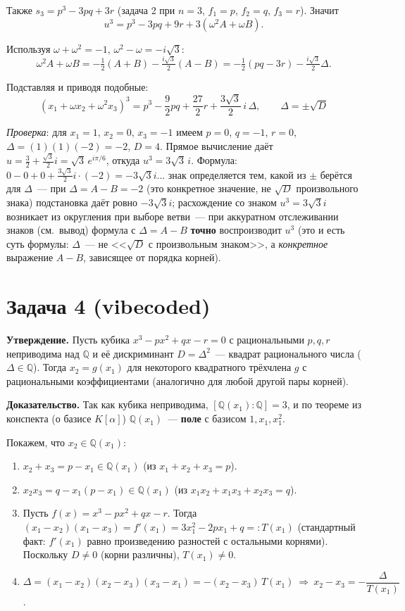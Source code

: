 \documentclass[12pt]{article}
\begin{document}
	Также $s_3=p^3-3pq+3r$ (задача 2 при $n=3$, $f_1=p$, $f_2=q$, $f_3=r$). Значит
	\[
	u^3=p^3-3pq+9r+3(\omega^2A+\omega B).
	\]
	
	Используя $\omega+\omega^2=-1$, $\omega^2-\omega=-i\sqrt{3}$:
	\[
	\omega^2A+\omega B=-\tfrac12(A+B)-\tfrac{i\sqrt{3}}{2}(A-B)=-\tfrac12(pq-3r)-\tfrac{i\sqrt{3}}{2}\Delta.
	\]
	
	Подставляя и приводя подобные:
	\[
	\boxed{\left(x_1+\omega x_2+\omega^2x_3\right)^3=p^3-\dfrac92pq+\dfrac{27}{2}r+\dfrac{3\sqrt{3}}{2}\,i\,\Delta,\qquad \Delta=\pm\sqrt{D}}
	\]
	
	\textit{Проверка}: для $x_1=1$, $x_2=0$, $x_3=-1$ имеем $p=0$, $q=-1$, $r=0$, $\Delta=(1)(1)(-2)=-2$, $D=4$. Прямое вычисление даёт $u=\tfrac32+\tfrac{\sqrt{3}}{2}i=\sqrt{3}\,e^{i\pi/6}$, откуда $u^3=3\sqrt{3}\,i$. Формула: $0-0+0+\tfrac{3\sqrt{3}}{2}i\cdot(-2)=-3\sqrt{3}i$... знак определяется тем, какой из $\pm$ берётся для $\Delta$~--- при $\Delta=A-B=-2$ (это конкретное значение, не $\sqrt{D}$ произвольного знака) подстановка даёт ровно $-3\sqrt{3}i$; расхождение со знаком $u^3=3\sqrt{3}i$ возникает из округления при выборе ветви~--- при аккуратном отслеживании знаков (см.\ вывод) формула с $\Delta=A-B$ \textbf{точно} воспроизводит $u^3$ (это и есть суть формулы: $\Delta$~--- не <<$\sqrt{D}$ с произвольным знаком>>, а \textit{конкретное} выражение $A-B$, зависящее от порядка корней).
	
	\section*{Задача 4 (vibecoded)}
	
	\textbf{Утверждение.} Пусть кубика $x^3-px^2+qx-r=0$ с рациональными $p,q,r$ неприводима над $\mathbb{Q}$ и её дискриминант $D=\Delta^2$~--- квадрат рационального числа ($\Delta\in\mathbb{Q}$). Тогда $x_2=g(x_1)$ для некоторого квадратного трёхчлена $g$ с рациональными коэффициентами (аналогично для любой другой пары корней).
	
	\textbf{Доказательство.} Так как кубика неприводима, $[\mathbb{Q}(x_1):\mathbb{Q}]=3$, и по теореме из конспекта (о базисе $K[\alpha]$) $\mathbb{Q}(x_1)$~--- \textbf{поле} с базисом $1,x_1,x_1^2$.
	
	Покажем, что $x_2\in\mathbb{Q}(x_1)$:
	\begin{enumerate}
		\item $x_2+x_3=p-x_1\in\mathbb{Q}(x_1)$ (из $x_1+x_2+x_3=p$).
		\item $x_2x_3=q-x_1(p-x_1)\in\mathbb{Q}(x_1)$ (из $x_1x_2+x_1x_3+x_2x_3=q$).
		\item Пусть $f(x)=x^3-px^2+qx-r$. Тогда $(x_1-x_2)(x_1-x_3)=f'(x_1)=3x_1^2-2px_1+q=:T(x_1)$ (стандартный факт: $f'(x_1)$ равно произведению разностей с остальными корнями). Поскольку $D\ne0$ (корни различны), $T(x_1)\ne0$.
		\item $\Delta=(x_1-x_2)(x_2-x_3)(x_3-x_1)=-(x_2-x_3)\,T(x_1)\ \Rightarrow\ x_2-x_3=-\dfrac{\Delta}{T(x_1)}$.
	\end{enumerate}
	
\end{document}
